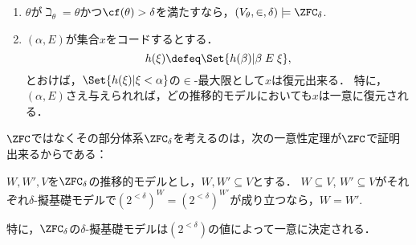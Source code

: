\documentclass[a4j,leqno]{ltjsarticle}
\theoremstyle{nonumberplain}
\begin{document}
\begin{remark}
 \begin{enumerate}
  \item $\theta$が$\beth_\theta = \theta$かつ$\cf(\theta) > \delta$を満たすなら，$(V_\theta, {\in}, \delta) \models \ZFC_\delta$.
  \item $(\alpha, E)$が集合$x$をコードするとする．
        \[
         h(\xi) \defeq \Set{ h(\beta) | \beta \mathrel{E} \xi },
        \]
        とおけば，$\Set{h(\xi) | \xi < \alpha}$の$\in$-最大限として$x$は復元出来る．
        特に，$(\alpha, E)$さえ与えられれば，どの推移的モデルにおいても$x$は一意に復元される．
 \end{enumerate}
\end{remark}
$\ZFC$ではなくその部分体系$\ZFC_\delta$を考えるのは，次の一意性定理が$\ZFC$で証明出来るからである：
\begin{theorem}\label{thm:2-d-determ-pg}
 $W, W', V$を$\ZFC_\delta$の推移的モデルとし，$W, W' \subseteq V$とする．
 $W \subseteq V$, $W' \subseteq V$がそれぞれ$\delta$-擬基礎モデルで$(2^{<\delta})^W = (2^{<\delta})^{W'}$が成り立つなら，$W = W'$.
 
 特に，$\ZFC_\delta$の$\delta$-擬基礎モデルは$(2^{<\delta})$の値によって一意に決定される．
\end{theorem}
\end{document}
